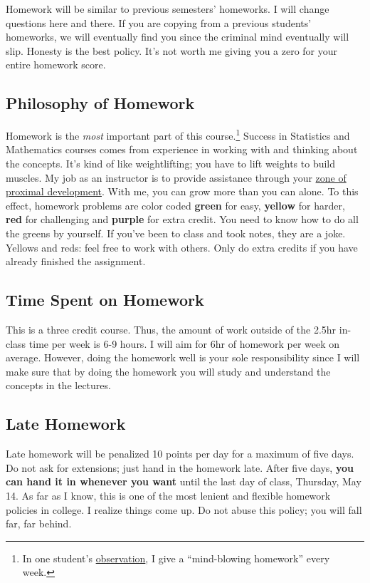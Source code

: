 \documentclass[12pt]{article}
\newcommand{\ingreen}[1]{\color{green}\textbf{#1} \color{black}}
\newcommand{\inyellow}[1]{\color{yellow}\textbf{#1} \color{black}}
\newcommand{\inred}[1]{\color{red}\textbf{#1} \color{black}}
\newcommand{\inpurple}[1]{\color{purple}\textbf{#1} \color{black}}
\newcommand{\qu}[1]{``#1''}
\begin{document}
Homework will be similar to previous semesters' homeworks. I will change questions here and there. If you are copying from a previous students' homeworks, we will eventually find you since the criminal mind eventually will slip. Honesty is the best policy. It's not worth me giving you a zero for your entire homework score.

\subsection*{Philosophy of Homework}


Homework is the \textit{most} important part of this course.\footnote{In one student's \href{http://www.ratemyprofessors.com/ShowRatings.jsp?tid=1951051}{observation}, I give a \qu{mind-blowing homework} every week.} Success in Statistics and Mathematics courses comes from experience in working with and thinking about the concepts. It's kind of like weightlifting; you have to lift weights to build muscles. My job as an instructor is to provide assistance through your \href{http://en.wikipedia.org/wiki/Zone_of_proximal_development}{zone of proximal development}. With me, you can grow more than you can alone. To this effect, homework problems are color coded \ingreen{green} for easy, \inyellow{yellow} for harder, \inred{red} for challenging and \inpurple{purple} for extra credit. You need to know how to do all the greens by yourself. If you've been to class and took notes, they are a joke. Yellows and reds: feel free to work with others. Only do extra credits if you have already finished the assignment.

\subsection*{Time Spent on Homework }

This is a three credit course. Thus, the amount of work outside of the 2.5hr in-class time per week is 6-9 hours. I will aim for 6hr of homework per week on average. However, doing the homework well is your sole responsibility since I will make sure that by doing the homework you will study and understand the concepts in the lectures.

\subsection*{Late Homework}

Late homework will be penalized 10 points per day for a maximum of five days. Do not ask for extensions; just hand in the homework late. After five days, \textbf{you can hand it in whenever you want} until the last day of class, Thursday, May 14. As far as I know, this is one of the most lenient and flexible homework policies in college. I realize things come up. Do not abuse this policy; you will fall far, far behind.
\end{document}
